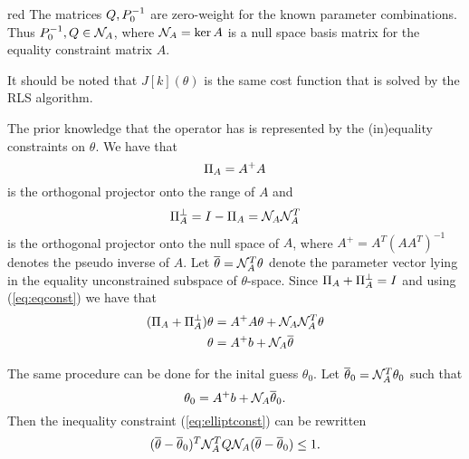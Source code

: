 \begin{assumption}

\begin{color}{red}
    The matrices $Q, P_0^{-1}$ are zero-weight for the known parameter combinations. Thus $P_0^{-1}, Q \in \mathcal{N}_A$, where
    $\mathcal{N}_A = \ker A$ is a null space basis matrix for the equality constraint matrix $A$.
\end{color}
\label{ass:NA_ass}
\end{assumption}
It should be noted that 
$J[k](\theta)$ is the same cost function that is solved
by the RLS algorithm. \cite{islam_recursive_2019}

The prior knowledge that the operator has is represented by the (in)equality constraints
on $\theta$. We have that
\begin{equation}
    \Pi_A = A^+A
\end{equation}
is the orthogonal projector onto the range of $A$ and
\begin{equation}
    \Pi_A^\perp = I - \Pi_A = \mathcal{N}_A\mathcal{N}_A^T
\end{equation}
is the orthogonal projector onto the null space of $A$,
where $A^+ = A^T(AA^T)^{-1}$ denotes the pseudo inverse of $A$.
Let $\overline{\theta} = \mathcal{N}_A^T\theta$ denote the parameter vector lying in the
equality unconstrained subspace of $\theta$-space. Since
$\Pi_A + \Pi_A^\perp = I$ and using (\ref{eq:eqconst}) we have that
\begin{align}
    (\Pi_A + \Pi_A^\perp)\theta &= A^+A\theta + \mathcal{N}_A\mathcal{N}_A^T\theta \notag \\
    \theta &= A^+b + \mathcal{N}_A\overline{\theta}
    \label{eq:thetanull}
\end{align}

The same procedure can be done for the inital guess $\theta_0$.
Let $\overline{\theta}_0 = \mathcal{N}_A^T\theta_0$ such that
\begin{equation}
    \theta_0 = A^+b + \mathcal{N}_A\overline{\theta}_0.
\end{equation}
Then the inequality constraint (\ref{eq:elliptconst}) can be rewritten
\begin{equation}
    (\overline{\theta}-\overline{\theta}_0)^T\mathcal{N}_A^TQ\mathcal{N}_A(\overline{\theta}-\overline{\theta}_0) \leq 1.
\end{equation}

